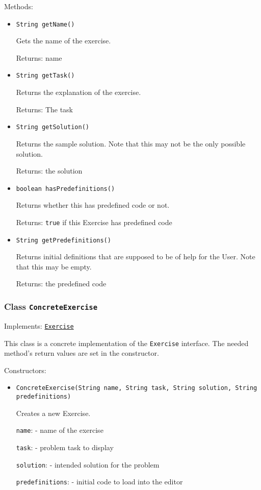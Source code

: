 Methods:
\begin{itemize}
\item \texttt{String getName()}

Gets the name of the exercise.

Returns: name

\item \texttt{String getTask()}

Returns the explanation of the exercise.

Returns: The task

\item \texttt{String getSolution()}

Returns the sample solution. Note that this may not be the only possible
 solution.

Returns: the solution

\item \texttt{boolean hasPredefinitions()}

Returns whether this has predefined code or not.

Returns: \texttt{true} if this Exercise has predefined code

\item \texttt{String getPredefinitions()}

Returns initial definitions that are supposed to be of help for the User.
 Note that this may be empty.

Returns: the predefined code

\end{itemize}

\subsubsection{Class \texttt{ConcreteExercise}}
\label{type:edu.kit.wavelength.client.view.exercise.ConcreteExercise}
Implements: \texttt{\hyperref[type:edu.kit.wavelength.client.view.exercise.Exercise]{Exercise}}

This class is a concrete implementation of the \texttt{Exercise} interface.
 The needed method's return values are set in the constructor.

Constructors:
\begin{itemize}
\item \texttt{ConcreteExercise(String name, String task, String solution, String predefinitions)}

Creates a new Exercise.

\texttt{name}: - name of the exercise

\texttt{task}: - problem task to display

\texttt{solution}: - intended solution for the problem

\texttt{predefinitions}: - initial code to load into the editor

\end{itemize}

